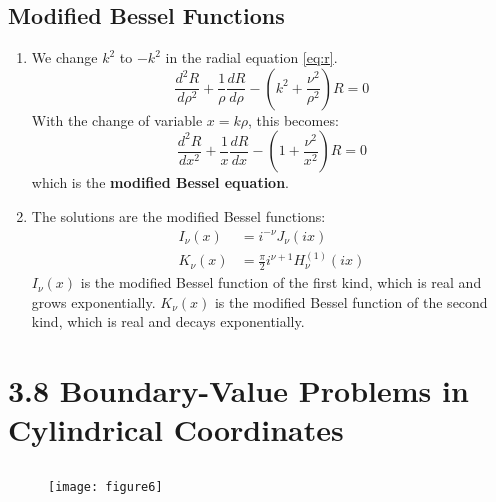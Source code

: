 \documentclass{article}
\begin{document}
	\subsection*{Modified Bessel Functions}
	\begin{enumerate}
		\item We change $k^2$ to $-k^2$ in the radial equation \eqref{eq:r}.
		$$ \frac{d^2 R}{d\rho^2} + \frac{1}{\rho} \frac{dR}{d\rho} - \left(k^2 + \frac{\nu^2}{\rho^2}\right) R = 0 $$
		With the change of variable $x = k\rho$, this becomes:
		$$ \frac{d^2 R}{dx^2} + \frac{1}{x} \frac{dR}{dx} - \left(1 + \frac{\nu^2}{x^2}\right) R = 0 $$
		which is the \textbf{modified Bessel equation}.
		
		\item The solutions are the modified Bessel functions:
		\begin{align*}
			I_\nu(x) &= i^{-\nu} J_\nu(ix) \\
			K_\nu(x) &= \frac{\pi}{2} i^{\nu+1} H_\nu^{(1)}(ix)
		\end{align*}
		$I_\nu(x)$ is the modified Bessel function of the first kind, which is real and grows exponentially.
		$K_\nu(x)$ is the modified Bessel function of the second kind, which is real and decays exponentially.
	\end{enumerate}
	
	\section*{3.8 Boundary-Value Problems in Cylindrical Coordinates}
	
	\subsection*{}
	\begin{figure}[h]
		\centering
		\texttt{[image: figure6]}
		\caption{}
		\label{fig:figure6}
	\end{figure}
	
\end{document}
